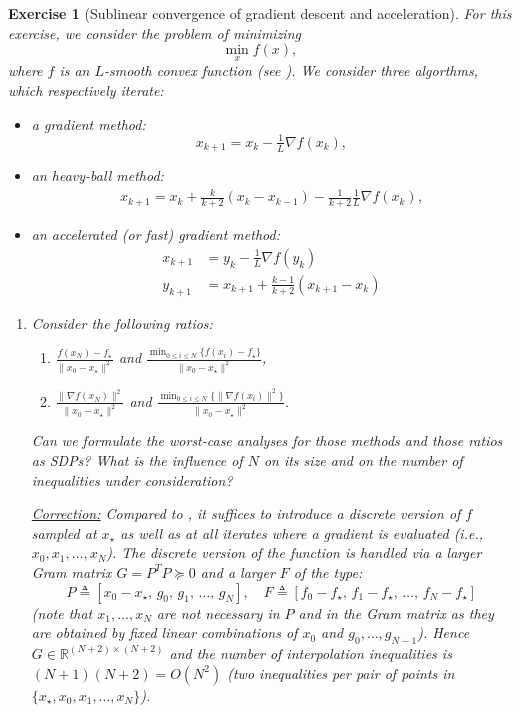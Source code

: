 \documentclass[11pt,a4paper]{article}
\newcommand{\correction}[1]{{{\color{blue}\underline{Correction:} #1}}}
\newcommand{\correction}[1]{}
\newtheorem{exercise}{Exercise}
\begin{document}
	\begin{exercise}[Sublinear convergence of gradient descent and acceleration]\label{ex:accel1}
	For this exercise, we consider the problem of minimizing
	\[\min_{x} f(x),\]
	where $f$ is an $L$-smooth convex function (see ). We consider three algorthms, which respectively iterate:
	\begin{itemize}
	\item a gradient method:
	\[x_{k+1}=x_k-\tfrac{1}{L} \nabla f(x_k),\]
	\item an heavy-ball method:
	\begin{equation*}
	\begin{aligned}
	x_{k+1}=x_{k}+\tfrac{k}{k+2} (x_{k}-x_{k-1})-\tfrac{1}{k+2}\tfrac{1}{L} \nabla f(x_{k}),
	\end{aligned}
	\end{equation*}
	\item an accelerated (or fast) gradient method:
	\begin{equation*}
	\begin{aligned}
	x_{k+1}&=y_k-\tfrac{1}{L}\nabla f(y_k)\\
	y_{k+1}&=x_{k+1}+\tfrac{k-1}{k+2}(x_{k+1}-x_k)
	\end{aligned}
	\end{equation*}
	\end{itemize}
	\begin{enumerate}
	\item Consider the following ratios:
	\begin{enumerate}
	\item $\frac{f(x_N)-f_\star}{\|x_0-x_\star\|^2}$ and $\frac{\min_{0\leqslant i\leqslant N}\{f(x_i)-f_\star\}}{\|x_0-x_\star\|^2}$,
	\item $\frac{\|\nabla f(x_N)\|^2}{\|x_0-x_\star\|^2}$ and $\frac{\min_{0\leqslant i\leqslant N}\{\|\nabla f(x_i)\|^2\}}{\|x_0-x_\star\|^2}$.
	\end{enumerate}
	Can we formulate the worst-case analyses for those methods and those ratios as SDPs? What is the influence of $N$ on its size and on the number of inequalities under consideration?
	
	\correction{Compared to , it suffices to introduce a discrete version of $f$ sampled at $x_\star$ as well as at all iterates where a gradient is evaluated (i.e., $x_0,x_1,\ldots,x_N$). The discrete version of the function is handled via a larger Gram matrix $G=P^T P\succcurlyeq 0$ and a larger $F$ of the type:
	\[ P \triangleq [x_0-x_\star,\,g_0,\,g_1,\,\ldots,\,g_N],\quad F \triangleq [f_0-f_\star,\,f_1-f_\star,\,\ldots,\,f_N-f_\star]\]
	(note that $x_1,\ldots,x_N$ are not necessary in $P$ and in the Gram matrix as they are obtained by fixed linear combinations of $x_0$ and $g_0,\ldots,g_{N-1}$). Hence $G\in\mathbb{R}^{(N+2)\times (N+2)}$ and the number of interpolation inequalities is $(N+1) (N+2)=O(N^2)$ (two inequalities per pair of points in $\{x_\star,x_0,x_1,\ldots,x_N\}$).
	
}
\end{enumerate}
\end{exercise}
\end{document}
